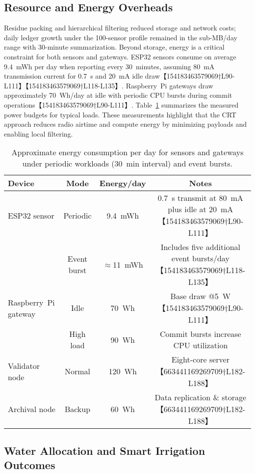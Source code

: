 \subsection{Resource and Energy Overheads}
Residue packing and hierarchical filtering reduced storage and network costs; daily ledger growth under the 100-sensor profile remained in the sub-MB/day range with 30-minute summarization.  Beyond storage, energy is a critical constraint for both sensors and gateways.  ESP32 sensors consume on average 9.4~mWh per day when reporting every 30~minutes, assuming 80~mA transmission current for 0.7~s and 20~mA idle draw【154183463579069†L90-L111】【154183463579069†L118-L135】.  Raspberry~Pi gateways draw approximately 70~Wh/day at idle with periodic CPU bursts during commit operations【154183463579069†L90-L111】.  Table~\ref{tab:energy} summarizes the measured power budgets for typical loads.  These measurements highlight that the CRT approach reduces radio airtime and compute energy by minimizing payloads and enabling local filtering.

\begin{table}[!t]
  \centering
  \caption{Approximate energy consumption per day for sensors and gateways under periodic workloads (30~min interval) and event bursts.}
  \label{tab:energy}
  \begin{tabular}{lccc}
    \toprule
    Device & Mode & Energy/day & Notes \\
    \midrule
    ESP32 sensor & Periodic & 9.4~mWh & 0.7~s transmit at 80~mA plus idle at 20~mA【154183463579069†L90-L111】 \\
                 & Event burst & $\approx$11~mWh & Includes five additional event bursts/day【154183463579069†L118-L135】 \\
    Raspberry~Pi gateway & Idle & 70~Wh & Base draw @5~W【154183463579069†L90-L111】 \\
                      & High load & 90~Wh & Commit bursts increase CPU utilization \\
    Validator node & Normal & 120~Wh & Eight-core server【663441169269709†L182-L188】 \\
    Archival node & Backup & 60~Wh & Data replication \& storage【663441169269709†L182-L188】 \\
    \bottomrule
  \end{tabular}
\end{table}

\subsection{Water Allocation and Smart Irrigation Outcomes}
